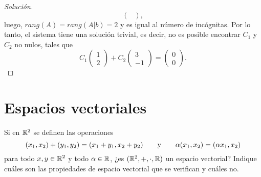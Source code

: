 \documentclass[a4,11pt]{aleph-notas}
\begin{document}
\begin{proof}[Solución]
\[\begin{pmatrix}
    \end{pmatrix},
    \]
    luego, $rang(A)= rang(A|b)= 2$ y es igual al número de incógnitas. Por lo tanto, el sistema tiene una solución trivial, es decir, no es posible encontrar $C_1$ y $C_2$ no nulos, tales que
    \[
C_1 \begin{pmatrix} 1 \\ 2 \end{pmatrix} + C_2 \begin{pmatrix} 3 \\ -1 \end{pmatrix} = \begin{pmatrix} 0 \\ 0 \end{pmatrix}.
\]
\end{proof}

\section{Espacios vectoriales}

\begin{ejer}
    Si en $\mathbb{R}^2$ se definen las operaciones
\[
(x_1,x_2) + (y_1,y_2) = (x_1+y_1,x_2+y_2) \qquad\text{y}\qquad \alpha(x_1,x_2) = (\alpha x_1,x_2)
\]
para todo $x,y\in\mathbb{R}^2$ y todo $\alpha\in\mathbb{R}$, ¿es $(\mathbb{R}^2,+,\cdot,\mathbb{R})$ un espacio vectorial? Indique cuáles son las propiedades de espacio vectorial que se verifican y cuáles no.
\end{ejer}
\end{document}
